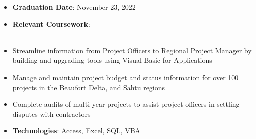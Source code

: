 \documentclass[10pt, letterpaper, ragged2e, withhyper]{altacv}
\begin{document}
\tagline{}

\makecvheader


\begin{paracol}{2}
        \begin{itemize}
            \item \textbf{Graduation Date}: November 23, 2022
            \item \textbf{Relevant Coursework}: \vspace*{1.25pt} \\
                
             \\
        \end{itemize}


            \begin{itemize}
                 \item Streamline information from Project Officers to Regional Project Manager by building and upgrading tools 
                 using Visual Basic for Applications
                \item Manage and maintain project budget and status information for over 100 projects in the Beaufort Delta, and Sahtu regions  
                \item Complete audits of multi-year projects to assist project officers in settling disputes with contractors 
                \item \textbf{Technologies}: Access, Excel, SQL, VBA 
            \end{itemize}


\end{paracol}
\end{document}
